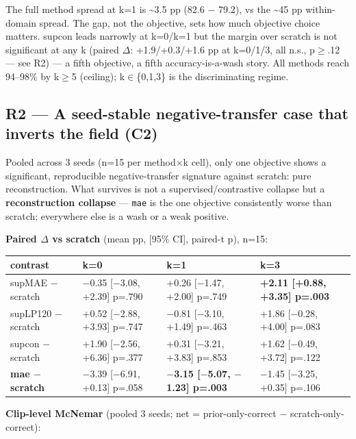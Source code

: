 The full method spread at k=1 is \textasciitilde{}3.5 pp (82.6 $-$ 79.2), vs the \textasciitilde{}45 pp within-domain spread. The gap, not the objective, sets how much objective choice matters. supcon leads narrowly at k=0/k=1 but the margin over scratch is not significant at any k (paired $\Delta$: +1.9/+0.3/+1.6 pp at k=0/1/3, all n.s., p$\ge$.12 --- see R2) --- a fifth objective, a fifth accuracy-is-a-wash story. All methods reach 94--98\% by k$\ge$5 (ceiling); k$\in$\{0,1,3\} is the discriminating regime.

\subsection{R2 --- A seed-stable negative-transfer case that inverts the field (C2)}

Pooled across 3 seeds (n=15 per method$\times$k cell), only one objective shows a significant, reproducible negative-transfer signature against scratch: pure reconstruction. What survives is not a supervised/contrastive collapse but a \textbf{reconstruction collapse} --- \texttt{mae} is the one objective consistently worse than scratch; everywhere else is a wash or a weak positive.

\textbf{Paired $\Delta$ vs scratch} (mean pp, [95\% CI], paired-t p), n=15:

\begin{center}
\small
\begin{tabular}{llll}
\toprule
contrast & k=0 & k=1 & k=3 \\
\midrule
supMAE $-$ scratch & $-$0.35 [$-$3.08, +2.39] p=.790 & +0.26 [$-$1.47, +2.00] p=.749 & \textbf{+2.11 [+0.88, +3.35] p=.003} \\
supLP120 $-$ scratch & +0.52 [$-$2.88, +3.93] p=.747 & $-$0.81 [$-$3.10, +1.49] p=.463 & +1.86 [$-$0.28, +4.00] p=.083 \\
supcon $-$ scratch & +1.90 [$-$2.56, +6.36] p=.377 & +0.31 [$-$3.21, +3.83] p=.853 & +1.62 [$-$0.49, +3.72] p=.122 \\
\textbf{mae $-$ scratch} & $-$3.39 [$-$6.91, +0.13] p=.058 & \textbf{$-$3.15 [$-$5.07, $-$1.23] p=.003} & $-$1.45 [$-$3.25, +0.35] p=.106 \\
\bottomrule
\end{tabular}
\end{center}

\textbf{Clip-level McNemar} (pooled 3 seeds; net = prior-only-correct $-$ scratch-only-correct):

